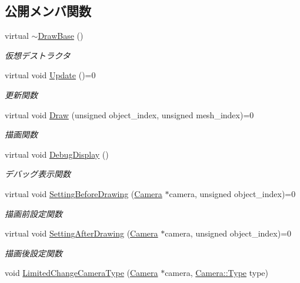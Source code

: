 \subsection*{公開メンバ関数}
\begin{DoxyCompactItemize}
\item 
virtual \mbox{\hyperlink{class_draw_base_a799597f696c5cbf6074fb2655dea5e18}{$\sim$\+Draw\+Base}} ()
\begin{DoxyCompactList}\small\item\em 仮想デストラクタ \end{DoxyCompactList}\item 
virtual void \mbox{\hyperlink{class_draw_base_af64b19d08a58927a789e2fb8a11cf524}{Update}} ()=0
\begin{DoxyCompactList}\small\item\em 更新関数 \end{DoxyCompactList}\item 
virtual void \mbox{\hyperlink{class_draw_base_a408080106630a1146d7af0bb46a4d8d1}{Draw}} (unsigned object\+\_\+index, unsigned mesh\+\_\+index)=0
\begin{DoxyCompactList}\small\item\em 描画関数 \end{DoxyCompactList}\item 
virtual void \mbox{\hyperlink{class_draw_base_a2ba175f791ee01508ffb2be24c68fe7f}{Debug\+Display}} ()
\begin{DoxyCompactList}\small\item\em デバッグ表示関数 \end{DoxyCompactList}\item 
virtual void \mbox{\hyperlink{class_draw_base_a3978252914ddde12197ea4577356bf25}{Setting\+Before\+Drawing}} (\mbox{\hyperlink{class_camera}{Camera}} $\ast$camera, unsigned object\+\_\+index)=0
\begin{DoxyCompactList}\small\item\em 描画前設定関数 \end{DoxyCompactList}\item 
virtual void \mbox{\hyperlink{class_draw_base_afe64f27b0bbf8c45da7aa0de4c3f3d65}{Setting\+After\+Drawing}} (\mbox{\hyperlink{class_camera}{Camera}} $\ast$camera, unsigned object\+\_\+index)=0
\begin{DoxyCompactList}\small\item\em 描画後設定関数 \end{DoxyCompactList}\item 
void \mbox{\hyperlink{class_draw_base_aa18abd488181eed72822f92a0f2521fe}{Limited\+Change\+Camera\+Type}} (\mbox{\hyperlink{class_camera}{Camera}} $\ast$camera, \mbox{\hyperlink{class_camera_a3b0a1f58deca679ac665f61c480d1dcb}{Camera\+::\+Type}} type)

\end{DoxyCompactItemize}
